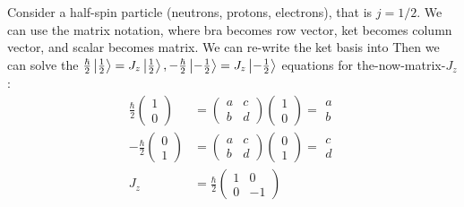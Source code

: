 \documentclass{school-22.101-notes}
\begin{document}
 Consider a half-spin particle (neutrons, protons, electrons), that is $j = 1/2$. We can use the matrix notation, where bra becomes row vector, ket becomes column vector, and scalar becomes matrix. We can re-write the ket basis into 
    Then we can solve the $\frac{\hbar}{2} \left| \frac{1}{2} \right> = J_z \left| \frac{1}{2} \right>, - \frac{\hbar}{2} \left| -\frac{1}{2} \right> = J_z \left| -\frac{1}{2} \right>$ equations for the-now-matrix-$J_z$: 
    \begin{align}
      \frac{\hbar}{2}  \left( \begin{array}{c} 1 \\ 0 \end{array} \right) &=  \left( \begin{array}{cc} a & c \\ b & d   \end{array} \right)  \left( \begin{array}{c} 1 \\ 0 \end{array} \right) = \begin{array}{c} a \\ b \end{array} \\
      - \frac{\hbar}{2}  \left( \begin{array}{c} 0 \\ 1 \end{array} \right) &=  \left( \begin{array}{cc} a & c \\ b & d   \end{array} \right)  \left( \begin{array}{c} 0 \\ 1 \end{array} \right) = \begin{array}{c} c \\ d \end{array} \\
      J_z &= \frac{\hbar}{2} \left( \begin{array}{cc} 1 & 0 \\ 0 & -1 \end{array} \right) 
    \end{align}
\end{document}
